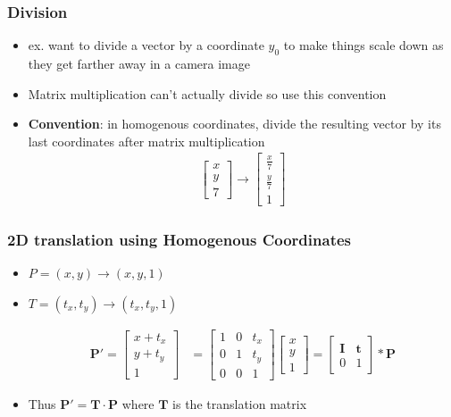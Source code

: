 \documentclass[letterpaper,12pt]{article}
\newcommand{\lra}{\ensuremath{\longrightarrow{}}}
\newcommand{\vect}[1]{\mathbf{#1}}
\newcommand{\matr}[1]{\mathbf{#1}}
\begin{document}
\subsubsection{Division}
\begin{itemize}
 \item ex. want to divide a vector by a coordinate $y_0$ to make things scale down as they get farther away in a camera image
 \item Matrix multiplication can't actually divide so use this convention
 \item \textbf{Convention}: in homogenous coordinates, divide the resulting vector by its last coordinates after matrix multiplication
       \begin{align}
        \begin{bmatrix}
         x \\
         y \\
         7
        \end{bmatrix}
        \lra
        \begin{bmatrix}
         \frac{x}{7} \\
         \frac{y}{7} \\
         1
        \end{bmatrix}
       \end{align}
\end{itemize}

\subsubsection{2D translation using Homogenous Coordinates}
\begin{itemize}
 \item $P = (x,y) \to (x,y,1)$
 \item $T = (t_x, t_y) \to (t_x, t_y, 1)$

       \begin{align}
        \vect{P}' = \begin{bmatrix}
         x + t_x \\
         y + t_y \\
         1
        \end{bmatrix}
         & = \begin{bmatrix}
         1 & 0 & t_x \\
         0 & 1 & t_y \\
         0 & 0 & 1
        \end{bmatrix}
        \begin{bmatrix}
         x \\
         y \\
         1
        \end{bmatrix}
        = \begin{bmatrix}
         \matr{I} & \vect{t} \\
         0        & 1
        \end{bmatrix}
        * \vect{P}
       \end{align}
 \item Thus $\vect{P}' = \matr{T}\cdot \vect{P}$ where $\matr{T}$ is the translation matrix
\end{itemize}
\end{document}
